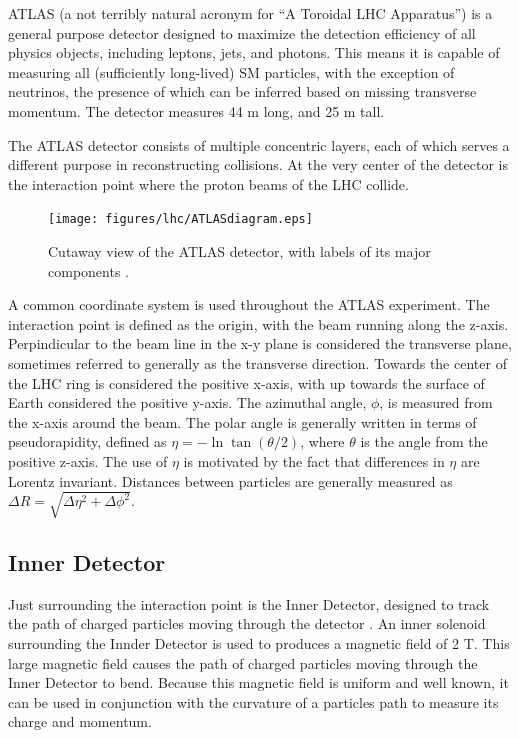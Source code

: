 ATLAS (a not terribly natural acronym for ``A Toroidal LHC Apparatus'') is a general purpose detector designed to maximize the detection efficiency of all physics objects, including leptons, jets, and photons. This means it is capable of measuring all (sufficiently long-lived) SM particles, with the exception of neutrinos, the presence of which can be inferred based on missing transverse momentum. The detector measures 44 m long, and 25 m tall. 

The ATLAS detector consists of multiple concentric layers, each of which serves a different purpose in reconstructing collisions. At the very center of the detector is the interaction point where the proton beams of the LHC collide. 

\begin{figure}[H]
\centering
   \texttt{[image: figures/lhc/ATLASdiagram.eps]}
\caption{Cutaway view of the ATLAS detector, with labels of its major components \cite{PERF-2007-01}.}
\label{fig:ATLAS}
\end{figure}

A common coordinate system is used throughout the ATLAS experiment. The interaction point is defined as the origin, with the beam running along the z-axis. Perpindicular to the beam line in the x-y plane is considered the transverse plane, sometimes referred to generally as the transverse direction. Towards the center of the LHC ring is considered the positive x-axis, with up towards the surface of Earth considered the positive y-axis. The azimuthal angle, $\phi$, is measured from the x-axis around the beam. The polar angle is generally written in terms of pseudorapidity, defined as $\eta = -\ln\tan(\theta/2)$, where $\theta$ is the angle from the positive z-axis. The use of $\eta$ is motivated by the fact that differences in $\eta$ are Lorentz invariant. Distances between particles are generally measured as $\Delta R = \sqrt{\Delta\eta^2 + \Delta\phi^2}$.

\subsection{Inner Detector}
\label{sec:innerDetector}

Just surrounding the interaction point is the Inner Detector, designed to track the path of charged particles moving through the detector \cite{IDET-2010-01}. An inner solenoid surrounding the Innder Detector is used to produces a magnetic field of 2 T. This large magnetic field causes the path of charged particles moving through the Inner Detector to bend. Because this magnetic field is uniform and well known, it can be used in conjunction with the curvature of a particles path to measure its charge and momentum.


